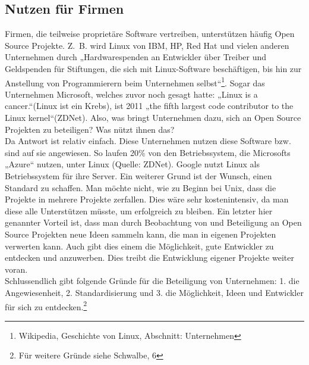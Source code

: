 \documentclass[a4paper,12pt]{article}
\begin{document}
\subsection{Nutzen für Firmen}
Firmen, die teilweise proprietäre Software vertreiben, unterstützen häufig Open Source Projekte. Z.~B. wird Linux von IBM, HP, Red Hat und vielen anderen Unternehmen durch „Hardwarespenden an Entwickler über Treiber und Geldspenden für Stiftungen, die sich mit Linux-Software beschäftigen, bis hin zur Anstellung von Programmierern beim Unternehmen selbst“\footnote{Wikipedia, Geschichte von Linux, Abschnitt: Unternehmen}. Sogar das Unternehmen Microsoft, welches zuvor noch gesagt hatte: „Linux is a cancer.“(Linux ist ein Krebs), ist 2011 „the fifth largest code contributor to the Linux kernel“(ZDNet). Also, was bringt Unternehmen dazu, sich an Open Source Projekten zu beteiligen? Was nützt ihnen das?\\
Da Antwort ist relativ einfach. Diese Unternehmen nutzen diese Software bzw. sind auf sie angewiesen. So laufen 20\% von den Betriebssystem, die Microsofts „Azure“ nutzen, unter Linux (Quelle: ZDNet). Google nutzt Linux als Betriebssystem für ihre Server. Ein weiterer Grund ist der Wunsch, einen Standard zu schaffen. Man möchte nicht, wie zu Beginn bei Unix, dass die Projekte in mehrere Projekte zerfallen. Dies wäre sehr kostenintensiv, da man diese alle Unterstützen müsste, um erfolgreich zu bleiben. Ein letzter hier genannter Vorteil ist, dass man durch Beobachtung von und Beteiligung an Open Source Projekten neue Ideen sammeln kann, die man in eigenen Projekten verwerten kann. Auch gibt dies einem die Möglichkeit, gute Entwickler zu entdecken und anzuwerben. Dies treibt die Entwicklung eigener Projekte weiter voran.\\
Schlussendlich gibt folgende Gründe für die Beteiligung von Unternehmen: 1. die Angewiesenheit, 2. Standardisierung und 3. die Möglichkeit, Ideen und Entwickler für sich zu entdecken.\footnote{Für weitere Gründe siehe Schwalbe, 6}
\end{document}
